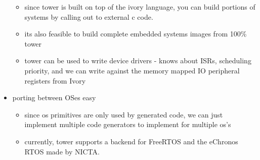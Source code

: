 \begin{itemize}
\begin{itemize}
		\item since tower is built on top of the ivory language, you can
			build portions of systems by calling out to external c
			code.
		\item its also feasible to build complete embedded systems
			images from 100\% tower
		\item tower can be used to write device drivers - knows about
			ISRs, scheduling priority, and we can write against the
			memory mapped IO peripheral registers from Ivory
	\end{itemize}
\item porting between OSes easy
	\begin{itemize}
		\item since os primitives are only used by generated code, we
			can just implement multiple code generators to
			implement for multiple os's
		\item currently, tower supports a backend for FreeRTOS and the
			eChronos RTOS made by NICTA.
	\end{itemize}
\end{itemize}
